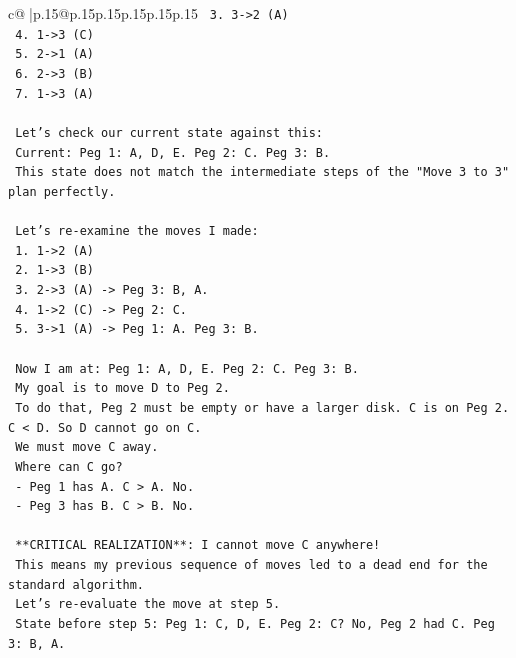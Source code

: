 \documentclass{article}
\begin{document}
{\begin{supertabular}{c@{$\;$}|p{.15\linewidth}@{}p{.15\linewidth}p{.15\linewidth}p{.15\linewidth}p{.15\linewidth}p{.15\linewidth}}
{{{\texttt{        3. 3{-}>2 (A)} \\
\texttt{        4. 1{-}>3 (C)} \\
\texttt{        5. 2{-}>1 (A)} \\
\texttt{        6. 2{-}>3 (B)} \\
\texttt{        7. 1{-}>3 (A)} \\
\\ 
\texttt{        Let's check our current state against this:} \\
\texttt{        Current: Peg 1: A, D, E. Peg 2: C. Peg 3: B.} \\
\texttt{        This state does not match the intermediate steps of the "Move 3 to 3" plan perfectly.} \\
\\ 
\texttt{        Let's re{-}examine the moves I made:} \\
\texttt{        1. 1{-}>2 (A)} \\
\texttt{        2. 1{-}>3 (B)} \\
\texttt{        3. 2{-}>3 (A) {-}> Peg 3: B, A.} \\
\texttt{        4. 1{-}>2 (C) {-}> Peg 2: C.} \\
\texttt{        5. 3{-}>1 (A) {-}> Peg 1: A. Peg 3: B.} \\
\\ 
\texttt{        Now I am at: Peg 1: A, D, E. Peg 2: C. Peg 3: B.} \\
\texttt{        My goal is to move D to Peg 2.} \\
\texttt{        To do that, Peg 2 must be empty or have a larger disk. C is on Peg 2. C < D. So D cannot go on C.} \\
\texttt{        We must move C away.} \\
\texttt{        Where can C go?} \\
\texttt{        {-} Peg 1 has A. C > A. No.} \\
\texttt{        {-} Peg 3 has B. C > B. No.} \\
\\ 
\texttt{        **CRITICAL REALIZATION**: I cannot move C anywhere!} \\
\texttt{        This means my previous sequence of moves led to a dead end for the standard algorithm.} \\
\texttt{        Let's re{-}evaluate the move at step 5.} \\
\texttt{        State before step 5: Peg 1: C, D, E. Peg 2: C? No, Peg 2 had C. Peg 3: B, A.} \\
}}}
\end{supertabular}}
\end{document}
